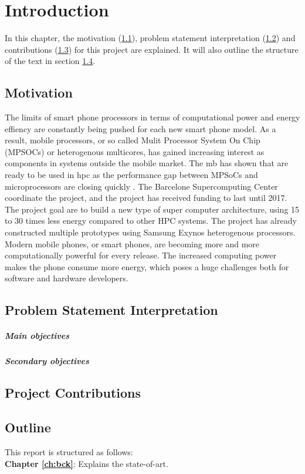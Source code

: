 \chapter{Introduction}
In this chapter, the motivation (\ref{sec:mot}), problem statement interpretation (\ref{sec:rq}) and contributions (\ref{sec:cont}) for this project are explained. It will also outline the structure of the text in section \ref{sec:out}.

\section{Motivation}
\label{sec:mot}
The limits of smart phone processors in terms of computational power and energy effiency are constantly being pushed for each new smart phone model. As a result, mobile processors, or so called Mulit Processor System On Chip (MPSOCs) or heterogenous multicores, has gained increasing interest as components in systems outside the mobile market. The \gls{mb} has shown that are ready to be used in \gls{hpc} as the performance gap between MPSoCs and microprocessors are closing quickly \cite{a:MB:Raj13}. The Barcelone Supercomputing Center coordinate the project, and the project has received funding to last until 2017. The project goal are to build a new type of super computer architecture, using 15 to 30 times less energy compared to other HPC systems. The project has already constructed multiple prototypes using Samsung Exynos \cite{m:Exy} heterogenous processors. \\

Modern mobile phones, or smart phones, are becoming more and more computationally powerful for every release. The increased computing power makes the phone consume more energy, which poses a huge challenges both for software and hardware developers.

\section{Problem Statement Interpretation}
\label{sec:rq}


\paragraph*{Main objectives} \hfill


\paragraph*{Secondary objectives} \hfill



\section{Project Contributions}
\label{sec:cont}


\section{Outline}
\label{sec:out}
This report is structured as follows:\\

\noindent
\textbf{Chapter \ref{ch:bck}}: Explains the state-of-art.
